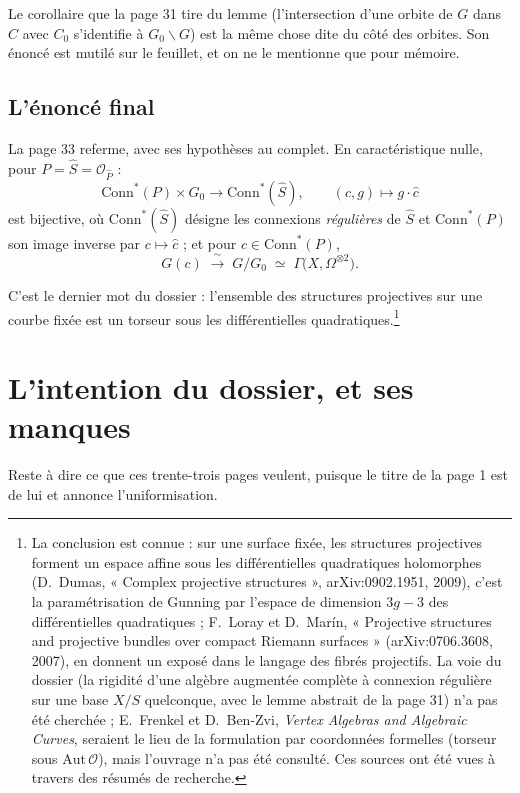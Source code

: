 \documentclass[11pt,a4paper]{article}
\begin{document}
Le corollaire que la page 31 tire du lemme (l'intersection d'une orbite de
$G$ dans $C$ avec $C_0$ s'identifie à $G_0 \backslash G$) est la même chose
dite du côté des orbites. Son énoncé est mutilé sur le feuillet, et on ne le
mentionne que pour mémoire.

\subsection*{L'énoncé final}

La page 33 referme, avec ses hypothèses au complet. En caractéristique
nulle, pour $P = \widehat{S} = \mathcal{O}_{\widehat{P}}$ :
\[
  \mathrm{Conn}^*(P) \times G_0 \longrightarrow
  \mathrm{Conn}^*(\widehat{S}), \qquad (c,g) \longmapsto g \cdot \widehat{c}
\]
est bijective, où $\mathrm{Conn}^*(\widehat{S})$ désigne les connexions
\emph{régulières} de $\widehat{S}$ et $\mathrm{Conn}^*(P)$ son image inverse
par $c \mapsto \widehat{c}$ ; et pour $c \in \mathrm{Conn}^*(P)$,
\[
  G(c) \;\xrightarrow{\ \sim\ }\; G/G_0 \;\simeq\;
  \Gamma\big(X, \Omega^{\otimes 2}\big).
\]

C'est le dernier mot du dossier : l'ensemble
des structures projectives sur une courbe fixée est un torseur sous les
différentielles quadratiques.\footnote{La conclusion est connue : sur une surface fixée, les structures
projectives forment un espace affine sous les différentielles quadratiques
holomorphes (D.~Dumas, « Complex projective structures », arXiv:0902.1951,
2009), c'est la paramétrisation de Gunning par l'espace de dimension $3g-3$
des différentielles quadratiques ; F.~Loray et D.~Marín, « Projective
structures and projective bundles over compact Riemann surfaces »
(arXiv:0706.3608, 2007), en donnent un exposé dans le langage des fibrés
projectifs. La voie du dossier (la
rigidité d'une algèbre augmentée complète à connexion régulière sur une base
$X/S$ quelconque, avec le lemme abstrait de la page 31) n'a pas été
cherchée ; E.~Frenkel et D.~Ben-Zvi, \emph{Vertex Algebras and Algebraic
Curves}, seraient le lieu de la formulation par coordonnées formelles (torseur
sous $\mathrm{Aut}\,\mathcal{O}$), mais l'ouvrage n'a pas été consulté. Ces
sources ont été vues à travers des résumés de recherche.}

\section*{L'intention du dossier, et ses manques}

Reste à dire ce que ces trente-trois pages veulent, puisque le titre de la
page 1 est de lui et annonce l'uniformisation.
\end{document}
